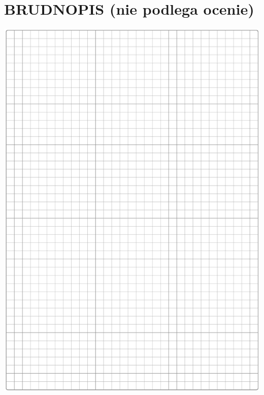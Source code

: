 \documentclass[10pt]{article}
\begin{document}
\section*{BRUDNOPIS (nie podlega ocenie)}
\begin{center}
\includegraphics[max width=\textwidth]{2024_11_21_769d5953f978b92e06f5g-07}
\end{center}
\end{document}

